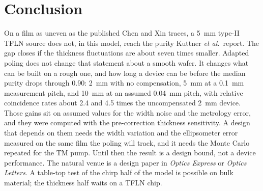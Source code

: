 \documentclass[11pt,a4paper]{article}
\begin{document}
\section{Conclusion}
On a film as uneven as the published Chen and Xin traces, a 5~mm type-II TFLN source does not, in this model, reach the purity Kuttner \emph{et al.}\ report.
The gap closes if the thickness fluctuations are about seven times smaller.
Adapted poling does not change that statement about a smooth wafer.
It changes what can be built on a rough one, and how long a device can be before the median purity drops through 0.90: 2~mm with no compensation, 5~mm at a 0.1~mm measurement pitch, and 10~mm at an assumed 0.04~mm pitch, with relative coincidence rates about 2.4 and 4.5 times the uncompensated 2~mm device.
Those gains sit on assumed values for the width noise and the metrology error, and they were computed with the pre-correction thickness sensitivity.
A design that depends on them needs the width variation and the ellipsometer error measured on the same film the poling will track, and it needs the Monte Carlo repeated for the TM pump.
Until then the result is a design bound, not a device performance.
The natural venue is a design paper in \emph{Optics Express} or \emph{Optics Letters}.
A table-top test of the chirp half of the model is possible on bulk material; the thickness half waits on a TFLN chip.



\end{document}
